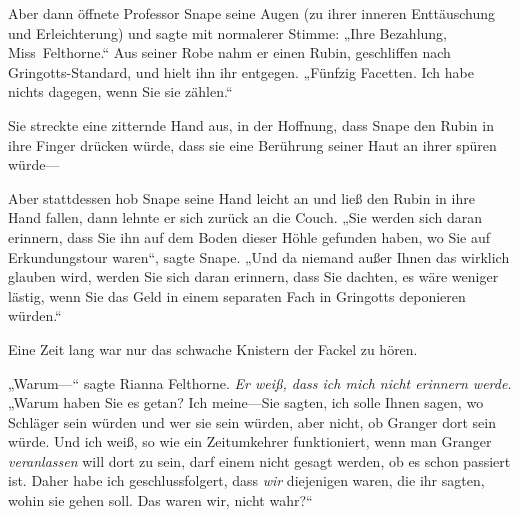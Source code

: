 Aber dann öffnete Professor Snape seine Augen (zu ihrer inneren Enttäuschung und Erleichterung) und sagte mit normalerer Stimme: „Ihre Bezahlung, Miss~Felthorne.“ Aus seiner Robe nahm er einen Rubin, geschliffen nach Gringotts-Standard, und hielt ihn ihr entgegen. „Fünfzig Facetten. Ich habe nichts dagegen, wenn Sie sie zählen.“

Sie streckte eine zitternde Hand aus, in der Hoffnung, dass Snape den Rubin in ihre Finger drücken würde, dass sie eine Berührung seiner Haut an ihrer spüren würde—

Aber stattdessen hob Snape seine Hand leicht an und ließ den Rubin in ihre Hand fallen, dann lehnte er sich zurück an die Couch. „Sie werden sich daran erinnern, dass Sie ihn auf dem Boden dieser Höhle gefunden haben, wo Sie auf Erkundungstour waren“, sagte Snape. „Und da niemand außer Ihnen das wirklich glauben wird, werden Sie sich daran erinnern, dass Sie dachten, es wäre weniger lästig, wenn Sie das Geld in einem separaten Fach in Gringotts deponieren würden.“

Eine Zeit lang war nur das schwache Knistern der Fackel zu hören.

„Warum—“ sagte Rianna Felthorne. \emph{Er weiß, dass ich mich nicht erinnern werde.} „Warum haben Sie es getan? Ich meine—Sie sagten, ich solle Ihnen sagen, wo Schläger sein würden und wer sie sein würden, aber nicht, ob Granger dort sein würde. Und ich weiß, so wie ein Zeitumkehrer funktioniert, wenn man Granger \emph{veranlassen} will dort zu sein, darf einem nicht gesagt werden, ob es schon passiert ist. Daher habe ich geschlussfolgert, dass \emph{wir} diejenigen waren, die ihr sagten, wohin sie gehen soll. Das waren wir, nicht wahr?“

